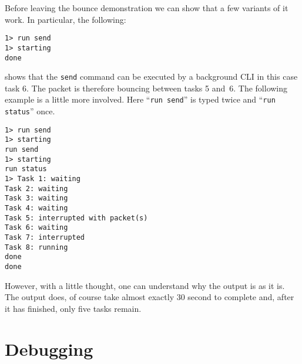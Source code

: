      Before leaving the bounce demonstration we can show that a few variants 
of it work.  In particular, the following:
\begin{verbatim}
1> run send
1> starting
done
\end{verbatim}
\noindent
shows that the \verb|send| command can be executed by a background CLI
in this case task 6.  The packet is therefore bouncing between tasks 5
and~6.  The following example is a little more involved.  Here
``\verb|run send|'' is typed twice and ``\verb|run status|'' once.
\begin{verbatim}
1> run send
1> starting
run send
1> starting
run status
1> Task 1: waiting
Task 2: waiting
Task 3: waiting
Task 4: waiting
Task 5: interrupted with packet(s)
Task 6: waiting
Task 7: interrupted
Task 8: running
done
done
\end{verbatim}
\noindent
However, with a little thought, one can understand why the output is
as it is.  The output does, of course take almost exactly 30 second to
complete and, after it has finished, only five tasks remain.

\section{Debugging}

